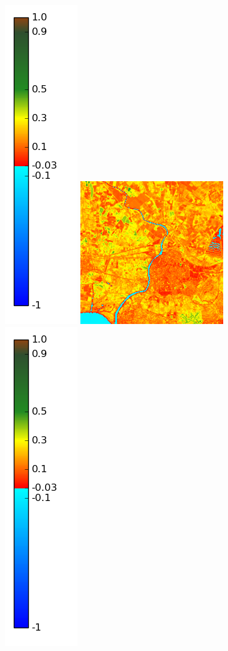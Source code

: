 \documentclass{book}
\begin{document}
\begin{figure}[H]
{\includegraphics[scale=0.2]{images/colormap.png}
\includegraphics[scale=0.4]{images/Agde/11_ndvi.png}
\includegraphics[scale=0.2]{images/colormap.png}
}
\end{figure}
\end{document}
